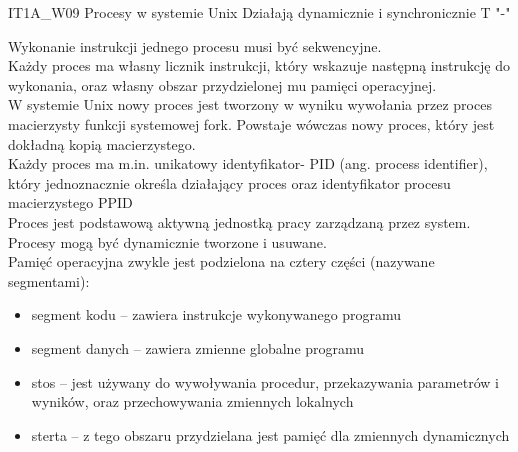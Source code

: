 \answer
{IT1A\_W09 Procesy w systemie Unix }
{Działają dynamicznie i synchronicznie}
{T}
{"-"}
{Wykonanie instrukcji jednego procesu musi być sekwencyjne. \\
Każdy proces ma własny licznik instrukcji, który wskazuje następną instrukcję do wykonania, oraz własny obszar przydzielonej mu pamięci operacyjnej.\\
W systemie Unix nowy proces jest tworzony w wyniku wywołania przez proces macierzysty funkcji systemowej fork. Powstaje wówczas nowy proces, który jest dokładną kopią macierzystego.\\
Każdy proces ma m.in. unikatowy identyfikator- PID (ang. process identifier), który jednoznacznie określa działający proces oraz identyfikator procesu macierzystego PPID\\
Proces jest podstawową aktywną jednostką pracy zarządzaną przez system.\\
Procesy mogą być dynamicznie tworzone i usuwane. \\
Pamięć operacyjna zwykle jest podzielona na cztery części (nazywane segmentami):
\begin{itemize}
\item segment kodu -- zawiera instrukcje wykonywanego programu
\item segment danych -- zawiera zmienne globalne programu
\item stos -- jest używany do wywoływania procedur, przekazywania parametrów i wyników, oraz przechowywania zmiennych lokalnych 
\item sterta -- z tego obszaru przydzielana jest pamięć dla zmiennych dynamicznych
\end{itemize}
}

